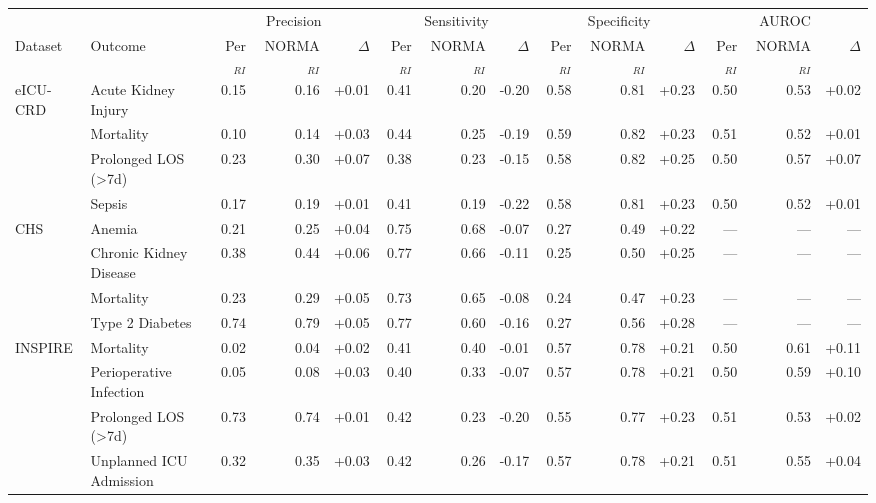 \begin{table}[ht]
\centering
\footnotesize
\begin{tabular}{llrrrrrrrrrrrr}
\toprule
 &  & \multicolumn{3}{c}{Precision} & \multicolumn{3}{c}{Sensitivity} & \multicolumn{3}{c}{Specificity} & \multicolumn{3}{c}{AUROC} \\
\cmidrule(lr){3-5} \cmidrule(lr){6-8} \cmidrule(lr){9-11} \cmidrule(lr){12-14}
Dataset & Outcome & Per$_{RI}$ & NORMA$_{RI}$ & $\Delta$ & Per$_{RI}$ & NORMA$_{RI}$ & $\Delta$ & Per$_{RI}$ & NORMA$_{RI}$ & $\Delta$ & Per$_{RI}$ & NORMA$_{RI}$ & $\Delta$ \\
\midrule
eICU-CRD & Acute Kidney Injury & 0.15 & 0.16 & +0.01 & 0.41 & 0.20 & -0.20 & 0.58 & 0.81 & +0.23 & 0.50 & 0.53 & +0.02 \\
 & Mortality & 0.10 & 0.14 & +0.03 & 0.44 & 0.25 & -0.19 & 0.59 & 0.82 & +0.23 & 0.51 & 0.52 & +0.01 \\
 & Prolonged LOS (>7d) & 0.23 & 0.30 & +0.07 & 0.38 & 0.23 & -0.15 & 0.58 & 0.82 & +0.25 & 0.50 & 0.57 & +0.07 \\
 & Sepsis & 0.17 & 0.19 & +0.01 & 0.41 & 0.19 & -0.22 & 0.58 & 0.81 & +0.23 & 0.50 & 0.52 & +0.01 \\
CHS & Anemia & 0.21 & 0.25 & +0.04 & 0.75 & 0.68 & -0.07 & 0.27 & 0.49 & +0.22 & --- & --- & --- \\
 & Chronic Kidney Disease & 0.38 & 0.44 & +0.06 & 0.77 & 0.66 & -0.11 & 0.25 & 0.50 & +0.25 & --- & --- & --- \\
 & Mortality & 0.23 & 0.29 & +0.05 & 0.73 & 0.65 & -0.08 & 0.24 & 0.47 & +0.23 & --- & --- & --- \\
 & Type 2 Diabetes & 0.74 & 0.79 & +0.05 & 0.77 & 0.60 & -0.16 & 0.27 & 0.56 & +0.28 & --- & --- & --- \\
INSPIRE & Mortality & 0.02 & 0.04 & +0.02 & 0.41 & 0.40 & -0.01 & 0.57 & 0.78 & +0.21 & 0.50 & 0.61 & +0.11 \\
 & Perioperative Infection & 0.05 & 0.08 & +0.03 & 0.40 & 0.33 & -0.07 & 0.57 & 0.78 & +0.21 & 0.50 & 0.59 & +0.10 \\
 & Prolonged LOS (>7d) & 0.73 & 0.74 & +0.01 & 0.42 & 0.23 & -0.20 & 0.55 & 0.77 & +0.23 & 0.51 & 0.53 & +0.02 \\
 & Unplanned ICU Admission & 0.32 & 0.35 & +0.03 & 0.42 & 0.26 & -0.17 & 0.57 & 0.78 & +0.21 & 0.51 & 0.55 & +0.04 \\
\bottomrule
\end{tabular}
\label{tab:12_eval}
\end{table}